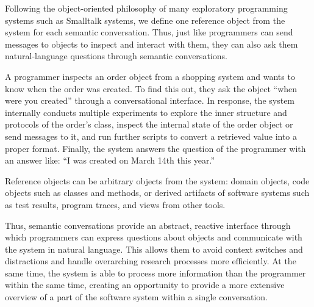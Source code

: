 Following the object-oriented philosophy of many exploratory programming systems such as Smalltalk systems, we define one reference object from the system for each semantic conversation.
Thus, just like programmers can send messages to objects to inspect and interact with them, they can also ask them natural-language questions through semantic conversations.

\begin{example}
	A programmer inspects an order object from a shopping system and wants to know when the order was created.
	To find this out, they ask the object ``when were you created'' through a conversational interface.
	In response, the system internally conducts multiple experiments to explore the inner structure and protocols of the order's class, inspect the internal state of the order object or send messages to it, and run further scripts to convert a retrieved value into a proper format.
	Finally, the system answers the question of the programmer with an answer like: ``I was created on March 14th this year.''
\end{example}

Reference objects can be arbitrary objects from the system: domain objects, code objects such as classes and methods, or derived artifacts of software systems such as test results, program traces, and views from other tools.

Thus, semantic conversations provide an abstract, reactive interface through which programmers can express questions about objects and communicate with the system in natural language.
This allows them to avoid context switches and distractions and handle overarching research processes more efficiently.
At the same time, the system is able to process more information than the programmer within the same time, creating an opportunity to provide a more extensive overview of a part of the software system within a single conversation.
